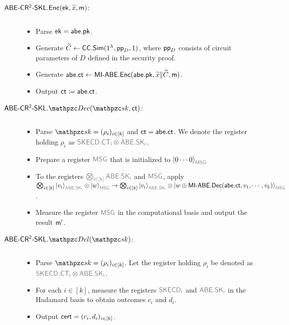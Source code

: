 \begin{description}
\begin{itemize}
\end{itemize}

\item[$\mathsf{ABE}\textrm{-}\mathsf{CR^2}\textrm{-}\mathsf{SKL}.\mathsf{Enc}(\mathsf{ek},\widetilde{x},\mathsf{m})$:] $ $
\begin{itemize}
    \item Parse $\mathsf{ek}=\mathsf{abe}.\mathsf{pk}$.
\item Generate $\widetilde{C}\leftarrow\mathsf{CC}.\mathsf{Sim}(1^\lambda,\mathsf{pp}_D,1)$, where $\mathsf{pp}_D$ consists of circuit parameters of $D$ defined in the security proof.
    \item Generate $\mathsf{abe}.\mathsf{ct}\leftarrow\mathsf{MI}\textrm{-}\mathsf{ABE}.\mathsf{Enc}(\mathsf{abe}.\mathsf{pk},\widetilde{x} \| \widetilde{C},\mathsf{m})$.
    \item Output $\mathsf{ct}\coloneqq\mathsf{abe}.\mathsf{ct}$.
\end{itemize}
 
\item[$\ABECRCRSKL.\qDec(\qsk,\ct)$:] $ $
\begin{itemize}
\item Parse $\qsk=(\rho_i)_{i\in[k]}$ and $\mathsf{ct}=\mathsf{abe}.\mathsf{ct}$. We
denote the register holding $\rho_i$ as $\qreg{SKECD.CT_i}\tensor\qreg{ABE.SK_i}$.

\item Prepare a register $\qreg{MSG}$ that is initialized to $\ket{0\cdots0}_{\qreg{MSG}}$

\item To the registers $\qreg{\bigotimes_{i\in[k]}ABE.SK_i}$ and
$\qreg{MSG}$, apply 
$\bigotimes_{i\in[k]}\ket{v_i}_{\qreg{ABE.SK_i}}\otimes\ket{w}_{\qreg{MSG}}\ra\bigotimes_{i\in[k]}\ket{v_i}_{\qreg{ABE.SK_i}}\otimes\ket{w\oplus\MIABE.\Dec(\abe.\ct,
v_1,\cdots,v_k)}_{\qreg{MSG}}$.

   \item Measure the register $\qreg{MSG}$ in the computational basis and output the result $\mathsf{m}^\prime$.
\end{itemize}

\item[$\ABECRCRSKL.\qDel(\qsk)$:] $ $
\begin{itemize}
\item Parse $\qsk = (\rho_i)_{i \in [k]}$. Let the register 
holding $\rho_i$ be denoted as $\qreg{SKECD.CT_i}\tensor\qreg{ABE.SK_i}$.
\item For each $i \in [k]$, measure the registers $\qreg{SKECD_i}$ and $\qreg{ABE.SK_i}$ in the Hadamard basis to
obtain outcomes $c_i$ and $d_i$.
\item Output $\mathsf{cert} = (c_i,d_i)_{i \in [k]}$.
\end{itemize}




\end{description}
